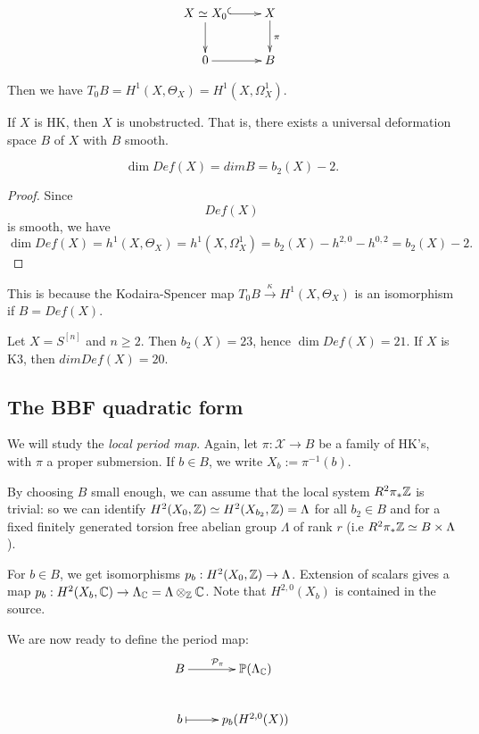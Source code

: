 \documentclass[11pt, english]{article}
\begin{document}
$$
\xymatrix{
	X \simeq X_0 \ar@{^(->}[r]  \ar[d] & X \ar[d]^\pi \\
	0 \ar[r] & B
}
$$

Then we have $T_0B = H^1(X, \Theta_X) = H^1(X,\Omega_X^1)$. 

\begin{thm}[Bogomolov]
If $X$ is HK, then $X$ is unobstructed. That is, there exists a universal deformation space $B$ of $X$ with $B$ smooth.
\end{thm}

\begin{corr}
$$
\dim Def(X) = dim B = b_2(X)-2.
$$
\end{corr}
\begin{proof}
Since $$Def(X)$$ is smooth, we have
$$
\dim Def(X) = h^1(X,\Theta_X) = h^1(X, \Omega_X^1) = b_2(X) - h^{2,0}-h^{0,2} = b_2(X) - 2.
$$
\end{proof}

\begin{remark}
This is because the Kodaira-Spencer map $T_0B \xrightarrow{\kappa} H^1(X, \Theta_X)$ is an isomorphism if $B= Def(X)$.
\end{remark}

\begin{example}
Let $X = S^{[n]}$ and $n \geq 2$. Then $b_2(X)=23$, hence $\dim Def(X) = 21$. If $X$ is K3, then $dim Def(X) = 20$. 
\end{example}

\subsection{The BBF quadratic form}

We will study the \emph{local period map}. Again, let $\pi:\mathscr X \to B$ be a family of HK's, with $\pi$ a proper submersion. If $b \in B$, we write $X_b := \pi^{-1}(b)$. 

By choosing $B$ small enough, we can assume that the local system $R^2\pi_\ast \mathbb{Z}$ is trivial: so we can identify $H^2(X_0,\mathbb{Z}) \simeq H^2(X_{b_2},\mathbb{Z})= \Lambda$ for all $b_2 \in B$ and for a fixed finitely generated torsion free abelian group $\Lambda$ of rank $r$ (i.e $R^2 \pi_\ast \mathbb{Z} \simeq B \times \Lambda$). 

For $b \in B$, we get isomorphisms $p_b:H^2(X_0, \mathbb{Z}) \to \Lambda$. Extension of scalars gives a map $p_b:H^2(X_b,\mathbb{C}) \to \Lambda_{\mathbb{C}} = \Lambda \otimes_{\mathbb{Z}} \mathbb{C}$. Note that $H^{2,0}(X_b)$ is contained in the source. 

We are now ready to define the period map:
$$
\xymatrix{
	B \ar[r]^{\mathcal P_\pi} & \PP(\Lambda_\C) \\
	b \ar@{|->}[r] & p_b(H^{2,0}(X))
}
$$
\end{document}
